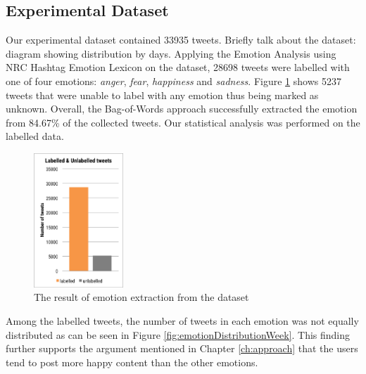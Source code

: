 \subsection{Experimental Dataset}
Our experimental dataset contained 33935 tweets. Briefly talk about the dataset: diagram showing distribution by days. Applying the Emotion Analysis using NRC Hashtag Emotion Lexicon \citep{mohammad2014using} on the dataset, 28698 tweets were labelled with one of four emotions: \textit{anger}, \textit{fear}, \textit{happiness} and \textit{sadness}. Figure \ref{fig:emotionLabel} shows 5237 tweets that were unable to label with any emotion thus being marked as unknown. Overall, the Bag-of-Words approach successfully extracted the emotion from 84.67\% of the collected tweets. Our statistical analysis was performed on the labelled data.

\begin{figure}[htb!]
\centering
\includegraphics[width=0.3\textwidth]{EmotionLabel}
\caption{The result of emotion extraction from the dataset}
\label{fig:emotionLabel}
\end{figure}

Among the labelled tweets, the number of tweets in each emotion was not equally distributed as can be seen in Figure \ref{fig:emotionDistributionWeek}. This finding further supports the argument mentioned in Chapter \ref{ch:approach} that the users tend to post more happy content than the other emotions. 

